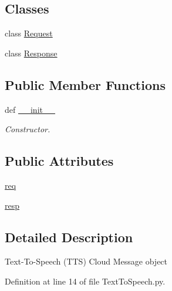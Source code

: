 \subsection*{Classes}
\begin{DoxyCompactItemize}
\item 
class \hyperlink{classRappCloud_1_1CloudMsgs_1_1TextToSpeech_1_1TextToSpeech_1_1Request}{Request}
\item 
class \hyperlink{classRappCloud_1_1CloudMsgs_1_1TextToSpeech_1_1TextToSpeech_1_1Response}{Response}
\end{DoxyCompactItemize}
\subsection*{Public Member Functions}
\begin{DoxyCompactItemize}
\item 
def \hyperlink{classRappCloud_1_1CloudMsgs_1_1TextToSpeech_1_1TextToSpeech_a9477da8332d948b7672772bb4a6f7d1c}{\-\_\-\-\_\-init\-\_\-\-\_\-}
\begin{DoxyCompactList}\small\item\em Constructor. \end{DoxyCompactList}\end{DoxyCompactItemize}
\subsection*{Public Attributes}
\begin{DoxyCompactItemize}
\item 
\hyperlink{classRappCloud_1_1CloudMsgs_1_1TextToSpeech_1_1TextToSpeech_a5bd3eec49c4346c618a92f1e39bc36c5}{req}
\item 
\hyperlink{classRappCloud_1_1CloudMsgs_1_1TextToSpeech_1_1TextToSpeech_ae99f79e1f8120b4827094110b28186e0}{resp}
\end{DoxyCompactItemize}


\subsection{Detailed Description}
\begin{DoxyVerb}Text-To-Speech (TTS) Cloud Message object\end{DoxyVerb}
 

Definition at line 14 of file Text\-To\-Speech.\-py.



